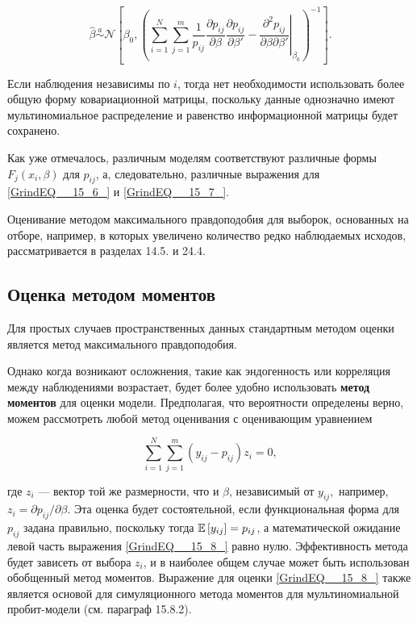 \begin{equation} 
\label{GrindEQ__15_7_} 
\widehat{\beta }\overset{a}{\sim }{\mathcal N}
\left[{\beta }_0,
{\left({\left.\sum^N_{i=1}{\sum^m_{j=1}{\frac{1}{p_{ij}}\frac{\partial p_{ij}}{\partial \beta }
\frac{\partial p_{ij}}{\partial {\beta }'}-
\frac{{\partial }^2p_{ij}}{\partial \beta \partial{\beta }'}}}\right|}_{{\beta }_0}\right)}^{-1}
\right]. 
\end{equation} 

Если наблюдения независимы по $i$, тогда нет необходимости использовать более общую форму ковариационной матрицы, поскольку данные однозначно имеют мультиномиальное распределение и равенство информационной матрицы будет сохранено.

Как уже отмечалось, различным моделям соответствуют различные формы $F_j(x_i,\beta )$ для $p_{ij}$, а, следовательно, различные выражения для \eqref{GrindEQ__15_6_} и \eqref{GrindEQ__15_7_}.

Оценивание методом максимального правдоподобия для выборок, основанных на отборе, например, в которых увеличено количество редко наблюдаемых исходов, рассматривается в разделах 14.5. и 24.4.

\subsection{ Оценка методом моментов}

Для простых случаев пространственных данных стандартным методом оценки является метод максимального правдоподобия.

Однако когда возникают осложнения, такие как эндогенность или корреляция между наблюдениями  возрастает, будет более удобно использовать \textbf{метод моментов} для оценки модели. Предполагая, что вероятности определены верно, можем рассмотреть любой метод оценивания с оценивающим уравнением

\begin{equation} 
\label{GrindEQ__15_8_} 
\sum^N_{i=1}{\sum^m_{j=1}{\left(y_{ij}-p_{ij}\right)z_i=0,}} 
\end{equation} 

где $z_i$ --- вектор той же размерности, что и $\beta $, независимый от $y_{ij},$ например, $z_i={\partial p_{ij}}/{\partial \beta }.$ Эта оценка будет состоятельной, если функциональная форма для $p_{ij}$ задана правильно, поскольку тогда $\mathbb{E}\left[y_{ij}\right]=p_{ij}$, а математической ожидание левой часть выражения \eqref{GrindEQ__15_8_}  равно нулю. Эффективность метода будет зависеть от выбора $z_i$, и в наиболее общем случае может быть использован обобщенный метод моментов. Выражение для оценки \eqref{GrindEQ__15_8_} также является основой для симуляционного метода моментов для мультиномиальной пробит-модели (см. параграф 15.8.2).

